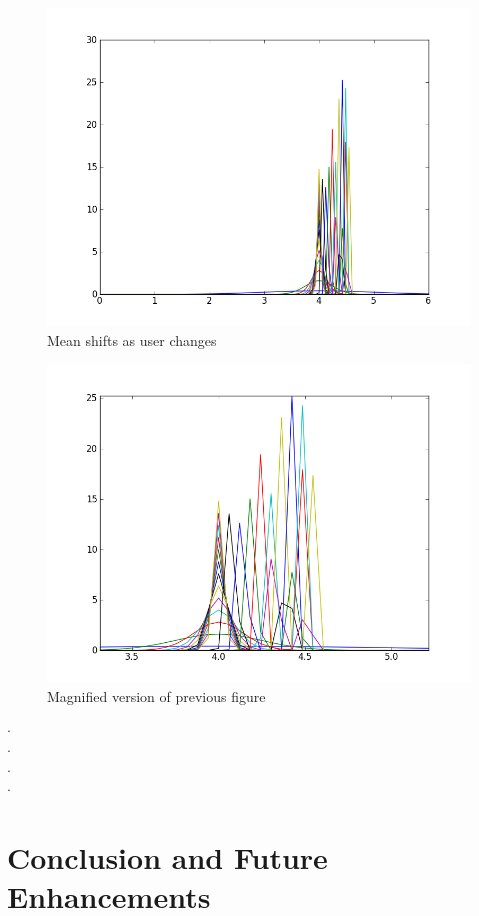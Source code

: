 \documentclass[12pt]{article}			%
\begin{document}
\begin{figure}
	\caption{Mean shifts as user changes}
	\centering
\includegraphics[scale=0.6]{img/mu_sig5.png}
\end{figure}

\begin{figure}
	\caption{Magnified version of previous figure}
	\centering
\includegraphics[scale=0.6]{img/mus_sig5.png}
\end{figure}

$\cdot$\\[10ex]
$\cdot$\\[10ex]
$\cdot$\\[10ex]
$\cdot$\\[10ex]
\newpage
\section{ Conclusion and Future Enhancements }
\end{document}
